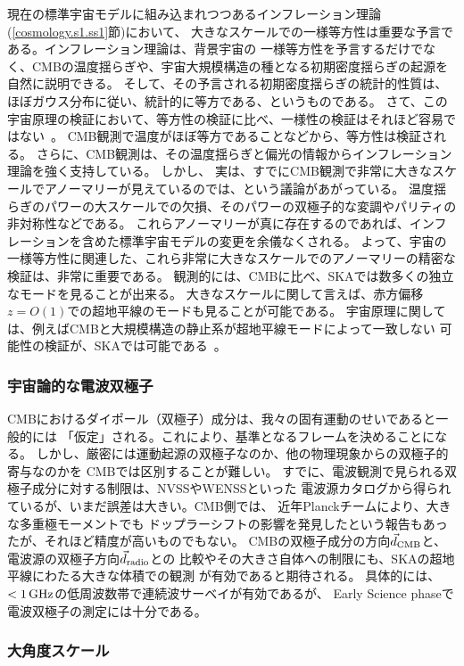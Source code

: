 現在の標準宇宙モデルに組み込まれつつあるインフレーション理論(\ref{cosmology.s1.ss1}節)において、
大きなスケールでの一様等方性は重要な予言である。インフレーション理論は、背景宇宙の
一様等方性を予言するだけでなく、CMBの温度揺らぎや、宇宙大規模構造の種となる初期密度揺らぎの起源を自然に説明できる。
そして、その予言される初期密度揺らぎの統計的性質は、ほぼガウス分布に従い、統計的に等方である、というものである。
さて、この宇宙原理の検証において、等方性の検証に比べ、一様性の検証はそれほど容易ではない~\citep{Ichiki:2014rua}。
CMB観測で温度がほぼ等方であることなどから、等方性は検証される。
さらに、CMB観測は、その温度揺らぎと偏光の情報からインフレーション理論を強く支持している。
しかし、
実は、すでにCMB観測で非常に大きなスケールでアノーマリーが見えているのでは、という議論があがっている。
温度揺らぎのパワーの大スケールでの欠損、そのパワーの双極子的な変調やパリティの非対称性などである。
これらアノーマリーが真に存在するのであれば、インフレーションを含めた標準宇宙モデルの変更を余儀なくされる。
よって、宇宙の一様等方性に関連した、これら非常に大きなスケールでのアノーマリーの精密な検証は、非常に重要である。
観測的には、CMBに比べ、SKAでは数多くの独立なモードを見ることが出来る。
大きなスケールに関して言えば、赤方偏移$z=O(1)$での超地平線のモードも見ることが可能である。
宇宙原理に関しては、例えばCMBと大規模構造の静止系が超地平線モードによって一致しない
可能性の検証が、SKAでは可能である~\citep{Schwarz:2015pqa}。

\subsubsection{宇宙論的な電波双極子} 

CMBにおけるダイポール（双極子）成分は、我々の固有運動のせいであると一般的には
「仮定」される。これにより、基準となるフレームを決めることになる。
しかし、厳密には運動起源の双極子なのか、他の物理現象からの双極子的寄与なのかを
CMBでは区別することが難しい。
すでに、電波観測で見られる双極子成分に対する制限は、NVSSやWENSSといった
電波源カタログから得られているが、いまだ誤差は大きい。CMB側では、
近年Planckチームにより、大きな多重極モーメントでも
ドップラーシフトの影響を発見したという報告もあったが、それほど精度が高いものでもない。
CMBの双極子成分の方向$\vec{d}_{\rm CMB}$と、電波源の双極子方向$\vec{d}_{\rm radio}$との
比較やその大きさ自体への制限にも、SKAの超地平線にわたる大きな体積での観測
が有効であると期待される。
具体的には、$< 1\,{\rm GHz}$の低周波数帯で連続波サーベイが有効であるが、
Early Science phaseで電波双極子の測定には十分である。

\subsubsection{大角度スケール}

